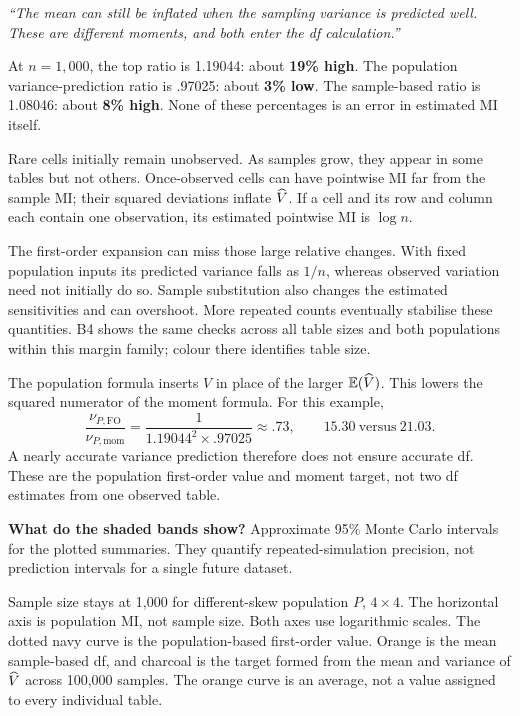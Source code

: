 \emph{``The mean can still be inflated when the sampling variance is predicted well. These are different moments, and both enter the df calculation.''}

At \(n=1{,}000\), the top ratio is 1.19044: about \textbf{19\% high}. The population variance-prediction ratio is .97025: about \textbf{3\% low}. The sample-based ratio is 1.08046: about \textbf{8\% high}. None of these percentages is an error in estimated MI itself.

Rare cells initially remain unobserved. As samples grow, they appear in some tables but not others. Once-observed cells can have pointwise MI far from the sample MI; their squared deviations inflate \(\widehat V\). If a cell and its row and column each contain one observation, its estimated pointwise MI is \(\log n\).

The first-order expansion can miss those large relative changes. With fixed population inputs its predicted variance falls as \(1/n\), whereas observed variation need not initially do so. Sample substitution also changes the estimated sensitivities and can overshoot. More repeated counts eventually stabilise these quantities. B4 shows the same checks across all table sizes and both populations within this margin family; colour there identifies table size.

The population formula inserts \(V\) in place of the larger \(\mathbb E(\widehat V)\). This lowers the squared numerator of the moment formula. For this example,
\[
\frac{\nu_{P,\mathrm{FO}}}{\nu_{P,\mathrm{mom}}}
=\frac{1}{1.19044^2\times.97025}\approx.73,
\qquad 15.30\ \text{versus}\ 21.03.
\]
A nearly accurate variance prediction therefore does not ensure accurate df. These are the population first-order value and moment target, not two df estimates from one observed table.

\textbf{What do the shaded bands show?} Approximate 95\% Monte Carlo intervals for the plotted summaries. They quantify repeated-simulation precision, not prediction intervals for a single future dataset.

\newpage
{}

Sample size stays at 1,000 for different-skew population \(P\), \(4\times4\). The horizontal axis is population MI, not sample size. Both axes use logarithmic scales. The dotted navy curve is the population-based first-order value. Orange is the mean sample-based df, and charcoal is the target formed from the mean and variance of \(\widehat V\) across 100,000 samples. The orange curve is an average, not a value assigned to every individual table.

